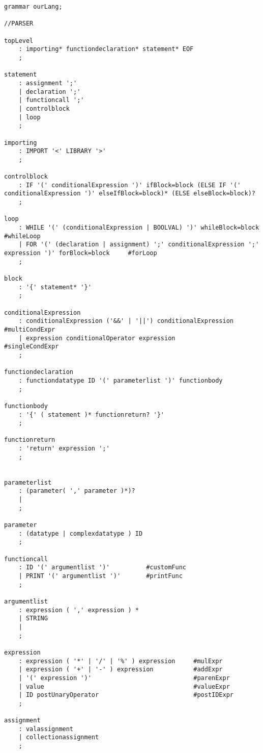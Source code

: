 \begin{lstlisting}[caption={\acrshort{cfg} and Lexing rules},frame=tlrb,label={app:CFG},numbers=none]
grammar ourLang;

//PARSER

topLevel
    : importing* functiondeclaration* statement* EOF
    ;

statement
    : assignment ';'
    | declaration ';'
    | functioncall ';'
    | controlblock
    | loop
    ;

importing
    : IMPORT '<' LIBRARY '>'
    ; 

controlblock
    : IF '(' conditionalExpression ')' ifBlock=block (ELSE IF '(' conditionalExpression ')' elseIfBlock=block)* (ELSE elseBlock=block)?
    ;

loop
    : WHILE '(' (conditionalExpression | BOOLVAL) ')' whileBlock=block      #whileLoop
    | FOR '(' (declaration | assignment) ';' conditionalExpression ';' expression ')' forBlock=block     #forLoop
    ;

block
    : '{' statement* '}'
    ;
    
conditionalExpression
    : conditionalExpression ('&&' | '||') conditionalExpression  #multiCondExpr
    | expression conditionalOperator expression                  #singleCondExpr
    ;

functiondeclaration
    : functiondatatype ID '(' parameterlist ')' functionbody
    ; 
    
functionbody
    : '{' ( statement )* functionreturn? '}'
    ;

functionreturn
    : 'return' expression ';'
    ;


parameterlist
    : (parameter( ',' parameter )*)?
    | 
    ;

parameter
    : (datatype | complexdatatype ) ID
    ;

functioncall
    : ID '(' argumentlist ')'          #customFunc
    | PRINT '(' argumentlist ')'       #printFunc
    ;

argumentlist
    : expression ( ',' expression ) *
    | STRING
    | 
    ;

expression
    : expression ( '*' | '/' | '%' ) expression     #mulExpr
    | expression ( '+' | '-' ) expression           #addExpr
    | '(' expression ')'                            #parenExpr
    | value                                         #valueExpr
    | ID postUnaryOperator                          #postIDExpr
    ;

assignment
    : valassignment
	| collectionassignment
    ;


\end{lstlisting}
